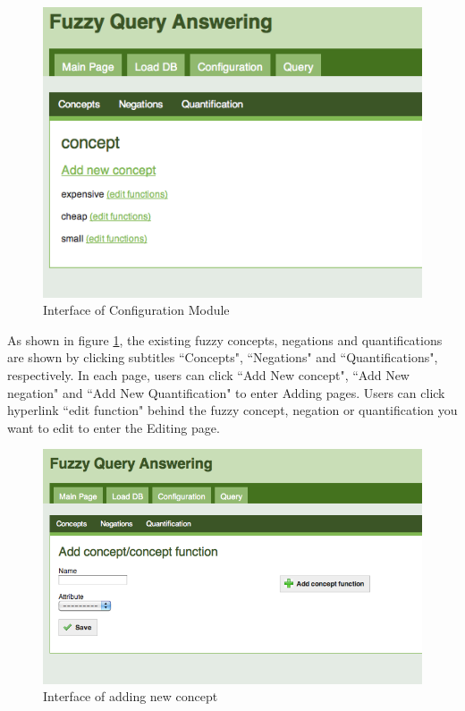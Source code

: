 \newpage
\begin{figure}[h]
\begin{center}
\includegraphics[scale=0.6]{Configuration.png}
\end{center}
\caption{Interface of Configuration Module}
\label{fig:CMI}
\end{figure}
As shown in figure \ref{fig:CMI}, the existing fuzzy concepts, negations and quantifications are shown by clicking subtitles ``Concepts", ``Negations" and ``Quantifications", respectively. In each page, users can click ``Add New concept", ``Add New negation" and ``Add New Quantification" to enter Adding pages.  Users can click hyperlink ``edit function" behind the fuzzy concept, negation or quantification you want to edit to enter the Editing page.
\newpage
\begin{figure}[h]
\begin{center}
\includegraphics[scale=0.6]{AddingNewConcept.png}
\end{center}
\caption{Interface of adding new concept}
\label{fig:AddNewConceptInterface}
\end{figure}
